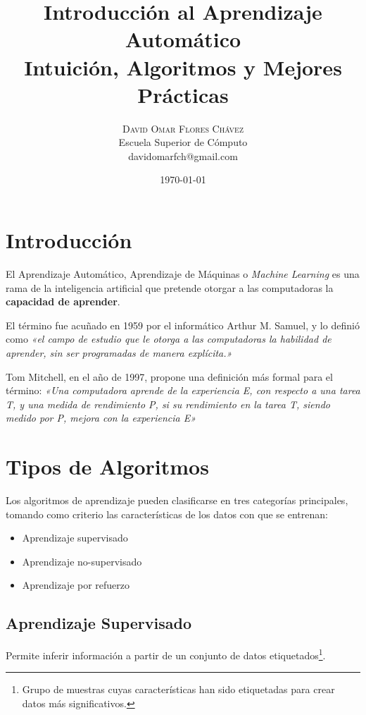 \documentclass[twoside,twocolumn]{article}
\title{Introducción al Aprendizaje Automático
    \large \\[2\baselineskip]
    Intuición, Algoritmos y Mejores Prácticas
    \\[2\baselineskip]
  } %
\author{
      \textsc{David Omar Flores Chávez} \\[1ex] %
      \normalsize Escuela Superior de Cómputo \\ %
      \normalsize {davidomarfch@gmail.com}\\[2\baselineskip] %
  }
\date{\today} %
\begin{document}
  
  \maketitle
  
  \section{Introducción}
  
    El Aprendizaje Automático, 
    Aprendizaje de Máquinas o \textit{Machine Learning} es una rama
    de la inteligencia artificial que pretende otorgar a las computadoras
    la \textbf{capacidad de aprender}.

    El término fue acuñado en 1959 por el informático Arthur M. Samuel, y lo
    definió como \textit{«el campo de estudio que le otorga a las computadoras
    la habilidad de aprender, sin ser programadas de manera explícita.»} \cite{Samuel:1959:SML:1661923.1661924}

    Tom Mitchell, en el año de 1997, propone una definición más formal para el
    término: \textit{«Una computadora aprende de la experiencia E, con respecto a
    una tarea T, y una medida de rendimiento P, si su rendimiento en la tarea T,
    siendo medido por P, mejora con la experiencia E»} \cite{Mitchell1997}

  
  \section{Tipos de Algoritmos}
  
      Los algoritmos de aprendizaje pueden clasificarse en tres
      categorías principales, tomando como criterio las 
      características de los datos con que se entrenan:

      \begin{itemize}
        \item Aprendizaje supervisado
        \item Aprendizaje no-supervisado
        \item Aprendizaje por refuerzo
      \end{itemize}

      \subsection{Aprendizaje Supervisado} 
        Permite inferir información a partir de un conjunto de
        datos etiquetados\footnote{Grupo de muestras cuyas características
        han sido etiquetadas para crear datos más significativos.}.
\end{document}
